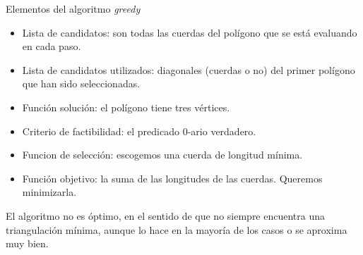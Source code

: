 \documentclass[compress]{beamer}
\begin{document}
\begin{frame}{Elementos del algoritmo \textit{greedy}}
\begin{itemize}
\item Lista de candidatos: son todas las cuerdas del polígono que se está evaluando en cada paso.                                     

\item Lista de candidatos utilizados: diagonales (cuerdas o no) del primer polígono que han sido seleccionadas.                                                                         

\item Función solución: el polígono tiene tres vértices.

\item Criterio de factibilidad: el predicado $0$-ario verdadero.

\item Funcion de selección: escogemos una cuerda de longitud mínima.                      

\item Función objetivo: la suma de las longitudes de las cuerdas. Queremos minimizarla.
\end{itemize}

\end{frame}

\begin{frame}
El algoritmo no es óptimo, en el sentido de que no siempre encuentra una triangulación mínima, aunque lo hace en la mayoría de los casos o se aproxima muy bien.
\end{frame}
\end{document}
